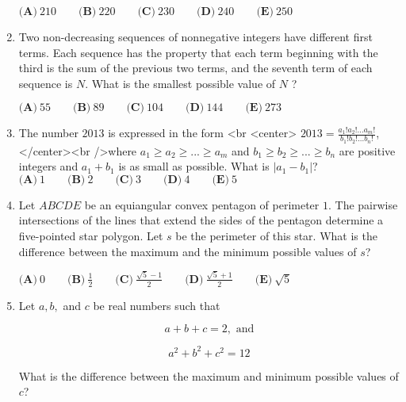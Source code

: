 \documentclass{article}
\begin{document}
\begin{enumerate}[label=\arabic*., itemsep=0.5em]
\(\textbf{(A)}\ 210 \qquad \textbf{(B)}\ 220 \qquad \textbf{(C)}\ 230 \qquad \textbf{(D)}\ 240 \qquad \textbf{(E)}\ 250\)\par \vspace{0.5em}\item Two non-decreasing sequences of nonnegative integers have different first terms. Each sequence has the property that each term beginning with the third is the sum of the previous two terms, and the seventh term of each sequence is \(N\). What is the smallest possible value of \(N\) ?

\(\textbf{(A)}\ 55 \qquad \textbf{(B)}\ 89 \qquad \textbf{(C)}\ 104 \qquad \textbf{(D)}\ 144 \qquad \textbf{(E)}\ 273\)\par \vspace{0.5em}\item The number \(2013\) is expressed in the form <br \> <center> \(2013 = \frac {a_1!a_2!...a_m!}{b_1!b_2!...b_n!}\),</center><br />where \(a_1 \ge a_2 \ge ... \ge a_m\) and \(b_1 \ge b_2 \ge ... \ge b_n\) are positive integers and \(a_1 + b_1\) is as small as possible. What is \(|a_1 - b_1|\)?
\(\textbf{(A)}\ 1 \qquad \textbf{(B)}\ 2 \qquad \textbf{(C)}\ 3 \qquad \textbf{(D)}\ 4 \qquad \textbf{(E)}\ 5\)\par \vspace{0.5em}\item Let \(ABCDE\) be an equiangular convex pentagon of perimeter \(1\). The pairwise intersections of the lines that extend the sides of the pentagon determine a five-pointed star polygon. Let \(s\) be the perimeter of this star. What is the difference between the maximum and the minimum possible values of \(s\)?

\(\textbf{(A)}\ 0 \qquad \textbf{(B)}\ \frac{1}{2} \qquad \textbf{(C)}\ \frac{\sqrt{5}-1}{2} \qquad \textbf{(D)}\  \frac{\sqrt{5}+1}{2} \qquad \textbf{(E)}\ \sqrt{5}\)\par \vspace{0.5em}\item Let \(a,b,\) and \(c\) be real numbers such that 


\begin{equation*}
a+b+c=2, \text{ and}
\end{equation*}


\begin{equation*}
a^2+b^2+c^2=12
\end{equation*}


What is the difference between the maximum and minimum possible values of \(c\)?


\end{enumerate}
\end{document}
